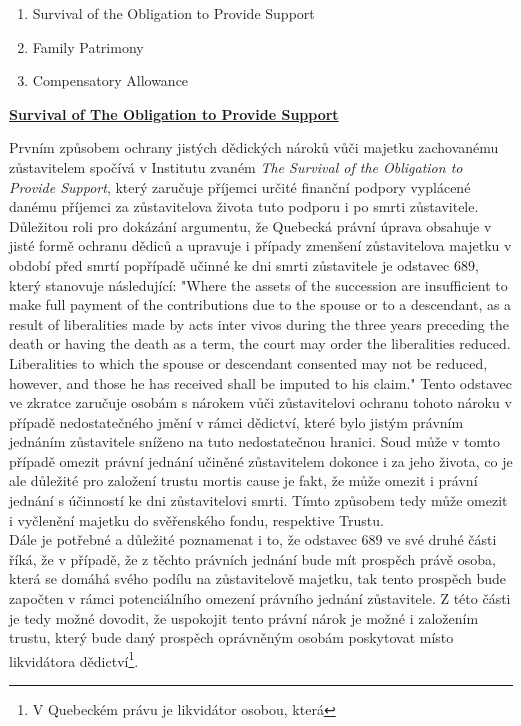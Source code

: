 \documentclass{article}
\begin{document}
\begin{enumerate}
\item Survival of the Obligation to Provide Support
\item Family Patrimony
\item Compensatory Allowance	
\end{enumerate}

\vspace{5 mm}

\underline{\textbf{Survival of The Obligation to Provide Support}}

Prvním způsobem ochrany jistých dědických nároků vůči majetku zachované\-mu zůstavitelem spočívá v Institutu zvaném \textit{The Survival of the Obligation to Provide Support}, který zaručuje příjemci určité finanční podpory vyplácené danému příjemci za zůstavitelova života tuto podporu i po smrti zůstavitele. \\

Důležitou roli pro dokázání argumentu, že Quebecká právní úprava obsahuje v jisté formě ochranu dědiců a upravuje i případy zmenšení zůstavitelova majetku v období před smrtí popřípadě učinné ke dni smrti zůstavitele je odstavec 689, který stanovuje následující: "Where the assets of the succession are insufficient to make full payment of the contributions due to the spouse or to a descendant, as a result of liberalities made by acts inter vivos during the three years preceding the death or having the death as a term, the court may order the liberalities reduced. \\

Liberalities to which the spouse or descendant consented may not be reduced, however, and those he has received shall be imputed to his claim." Tento odstavec ve zkratce zaručuje osobám s nárokem vůči zůstavitelovi ochranu tohoto nároku v případě nedostatečného jmění v rámci dědictví, které bylo jistým právním jednáním zůstavitele sníženo na tuto nedostatečnou hranici. Soud může v tomto případě omezit právní jednání učiněné zůstavitelem dokonce i za jeho života, co je ale důležité pro založení trustu mortis cause je fakt, že může omezit i právní jednání s účinností ke dni zůstavitelovi smrti. Tímto způsobem tedy může omezit i vyčlenění majetku do svěřenského fondu, respektive Trustu. \\

Dále je potřebné a důležité poznamenat i to, že odstavec 689 ve své druhé části říká, že v případě, že z těchto právních jednání bude mít prospěch právě osoba, která se domáhá svého podílu na zůstavitelově majetku, tak tento prospěch bude započten v rámci potenciálního omezení právního jednání zůstavitele. Z této části je tedy možné dovodit, že uspokojit tento právní nárok je možné i založením trustu, který bude daný prospěch oprávněným osobám poskytovat místo likvidátora dědictví\footnote{V Quebeckém právu je likvidátor osobou, která}.
\end{document}
